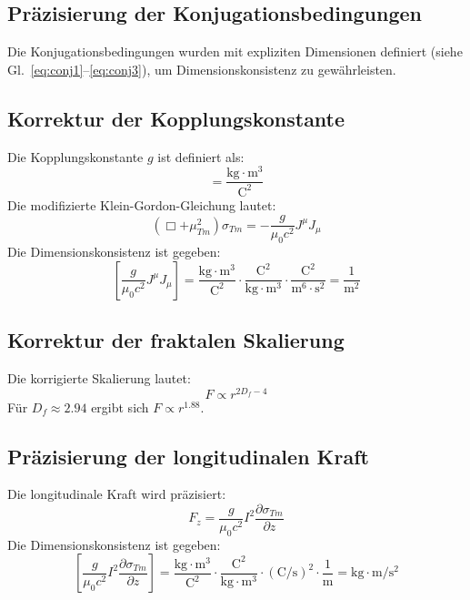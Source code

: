 	\subsection{Präzisierung der Konjugationsbedingungen}
	Die Konjugationsbedingungen wurden mit expliziten Dimensionen definiert (siehe Gl.~\ref{eq:conj1}–\ref{eq:conj3}), um Dimensionskonsistenz zu gewährleisten.
	
	\subsection{Korrektur der Kopplungskonstante}
	Die Kopplungskonstante $g$ ist definiert als:
	\begin{equation}
		[g] = \frac{\text{kg} \cdot \text{m}^3}{\text{C}^2}
	\end{equation}
	Die modifizierte Klein-Gordon-Gleichung lautet:
	\begin{equation}
		(\Box + \mu_{Tm}^2) \sigma_{Tm} = -\frac{g}{\mu_0 c^2} J^\mu J_\mu \label{eq:sigma_eq_final}
	\end{equation}
	Die Dimensionskonsistenz ist gegeben:
	\begin{equation}
		\left[\frac{g}{\mu_0 c^2} J^\mu J_\mu\right] = \frac{\text{kg} \cdot \text{m}^3}{\text{C}^2} \cdot \frac{\text{C}^2}{\text{kg} \cdot \text{m}^3} \cdot \frac{\text{C}^2}{\text{m}^6 \cdot \text{s}^2} = \frac{1}{\text{m}^2}
	\end{equation}
	
	\subsection{Korrektur der fraktalen Skalierung}
	Die korrigierte Skalierung lautet:
	\begin{equation}
		F \propto r^{2D_f - 4} \label{eq:fractal_scaling_final}
	\end{equation}
	Für $D_f \approx 2.94$ ergibt sich $F \propto r^{1.88}$.
	
	\subsection{Präzisierung der longitudinalen Kraft}
	Die longitudinale Kraft wird präzisiert:
	\begin{equation}
		F_z = \frac{g}{\mu_0 c^2} I^2 \frac{\partial \sigma_{Tm}}{\partial z} \label{eq:long_force_final}
	\end{equation}
	Die Dimensionskonsistenz ist gegeben:
	\begin{equation}
		\left[\frac{g}{\mu_0 c^2} I^2 \frac{\partial \sigma_{Tm}}{\partial z}\right] = \frac{\text{kg} \cdot \text{m}^3}{\text{C}^2} \cdot \frac{\text{C}^2}{\text{kg} \cdot \text{m}^3} \cdot (\text{C}/\text{s})^2 \cdot \frac{1}{\text{m}} = \text{kg} \cdot \text{m}/\text{s}^2
	\end{equation}
	
